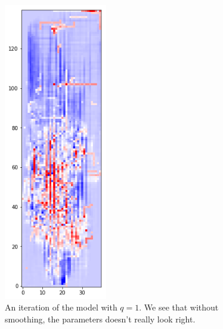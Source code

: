 \documentclass[11pt]{article}
\begin{document}
\begin{figure}[!h]
\centering
\includegraphics[width=0.4\textwidth]{no_smooth.png}
\caption{An iteration of the model with $q = 1$. We see that without smoothing, the parameters doesn't really look right. }
\label{nosmooth}
\end{figure}
\end{document}
